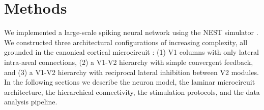 \section{Methods}
\label{sec:methods}

%
We implemented a large-scale spiking neural network using the NEST simulator \citep{Gewaltig2007}. We constructed three architectural configurations of increasing complexity, all grounded in the canonical cortical microcircuit \citep{Potjans2014}: (1) V1 columns with only lateral intra-areal connections, (2) a V1-V2 hierarchy with simple convergent feedback, and (3) a V1-V2 hierarchy with reciprocal lateral inhibition between V2 modules. In the following sections we describe the neuron model, the laminar microcircuit architecture, the hierarchical connectivity, the stimulation protocols, and the data analysis pipeline.

